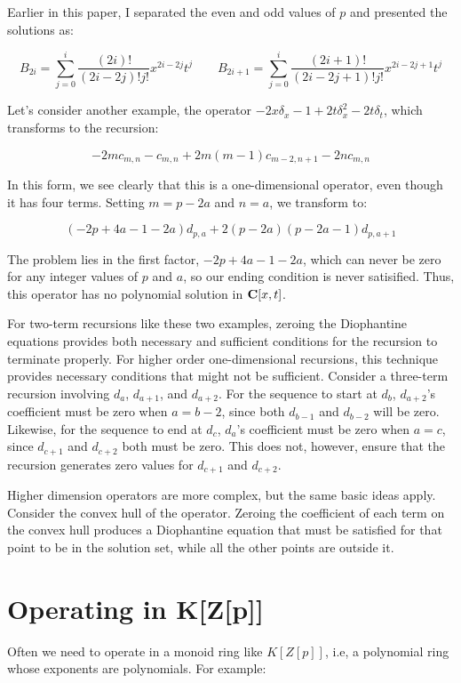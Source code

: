 \documentclass{article}
\newcommand{\C}{\ensuremath{{\bf C}}}
\begin{document}
Earlier in this paper, I separated the even and odd values of $p$ and presented the solutions as:

$$B_{2i} = \sum_{j=0}^i \frac{(2i)!}{(2i-2j)!j!} x^{2i-2j} t^{j}
\qquad B_{2i+1} = \sum_{j=0}^i \frac{(2i+1)!}{(2i-2j+1)!j!} x^{2i-2j+1} t^{j}$$

Let's consider another example, the operator $-2x\delta_x - 1 +2t\delta_x^2 - 2t\delta_t$,
which transforms to the recursion:

$$-2m c_{m,n} - c_{m,n} + 2m(m-1)c_{m-2,n+1} - 2nc_{m,n}$$

In this form, we see clearly that this is a one-dimensional operator, even though it
has four terms.  Setting $m=p-2a$ and $n=a$, we transform to:

$$(-2p+4a-1-2a)d_{p,a} + 2(p-2a)(p-2a-1)d_{p,a+1}$$

The problem lies in the first factor, $-2p+4a-1-2a$, which can never be zero for
any integer values of $p$ and $a$, so our ending condition is never satisified.
Thus, this operator has no polynomial solution in $\C[x,t]$.

For two-term recursions like these two examples, zeroing the
Diophantine equations provides both necessary and sufficient
conditions for the recursion to terminate properly.  For higher order
one-dimensional recursions, this technique provides necessary
conditions that might not be sufficient.  Consider a three-term
recursion involving $d_a$, $d_{a+1}$, and $d_{a+2}$.  For the sequence
to start at $d_b$, $d_{a+2}$'s coefficient must be zero when $a=b-2$,
since both $d_{b-1}$ and $d_{b-2}$ will be zero.  Likewise, for the
sequence to end at $d_c$, $d_a$'s coefficient must be zero when $a=c$,
since $d_{c+1}$ and $d_{c+2}$ both must be zero.  This does not,
however, ensure that the recursion generates zero values for $d_{c+1}$
and $d_{c+2}$.

Higher dimension operators are more complex, but the same basic ideas
apply.  Consider the convex hull of the operator.  Zeroing the
coefficient of each term on the convex hull produces a Diophantine
equation that must be satisfied for that point to be in the solution
set, while all the other points are outside it.



\vfill\eject
\section*{Operating in K[Z[p]]}

Often we need to operate in a monoid ring like $K[Z[p]]$, i.e, a
polynomial ring whose exponents are polynomials.  For example:
\end{document}
